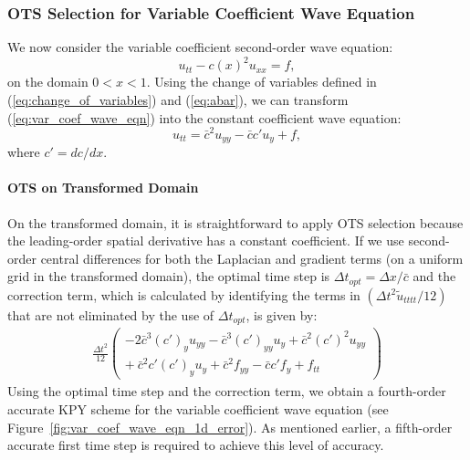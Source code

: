 \documentclass[twocolumn]{article} %
\newcommand{\beq}{\begin{equation}}
\newcommand{\eeq}{\end{equation}}
\newcommand{\bea}{\begin{eqnarray}}
\newcommand{\eea}{\end{eqnarray}}
\def\tu{\tilde{u}}
\def\cbar{\bar{c}}
\def\dt{\Delta t}
\def\dx{\Delta x}
\begin{document}
\subsubsection*{OTS Selection for Variable Coefficient Wave Equation}
We now consider the variable coefficient second-order wave equation:
\beq
    u_{tt} - c(x)^2 u_{xx} = f,
    \label{eq:var_coef_wave_eqn}
\eeq
on the domain $0 < x < 1$.  Using the change of variables defined in 
(\ref{eq:change_of_variables}) and (\ref{eq:abar}), we can transform 
(\ref{eq:var_coef_wave_eqn}) into the constant coefficient wave equation:
\beq
  u_{tt} = \cbar^2 u_{yy} - \cbar c' u_y + f,
\eeq
where $c' = dc/dx$.


\paragraph*{OTS on Transformed Domain}
On the transformed domain, it is straightforward to apply OTS selection 
because the leading-order spatial derivative has a constant coefficient.  
If we use second-order central differences for both the Laplacian and gradient 
terms (on a uniform grid in the transformed domain), the optimal time step is 
$\dt_{opt} = \dx/\cbar$ and the correction term, which is calculated by 
identifying the terms in $\left(\dt^2 \tu_{tttt}/12\right)$ that are not 
eliminated by the use of $\dt_{opt}$, is given by:
\bea
  \frac{\dt^2}{12} 
  \left(
    \begin{array}{l}
        -2 \cbar^3 (c')_y u_{yy}
        -\cbar^3 (c')_{yy} u_{y}
        + \cbar^2 (c')^2 u_{yy} 
        \\
        +\ \cbar^2 c' (c')_y u_{y}
        + \cbar^2 f_{yy}
        - \cbar c' f_y
        + f_{tt}
    \end{array}
  \right)
\eea
Using the optimal time step and the correction term, we obtain a fourth-order
accurate KPY scheme for the variable coefficient wave equation 
(see Figure~\ref{fig:var_coef_wave_eqn_1d_error}).  As mentioned earlier,
a fifth-order accurate first time step is required to achieve this level of
accuracy.
\end{document}
